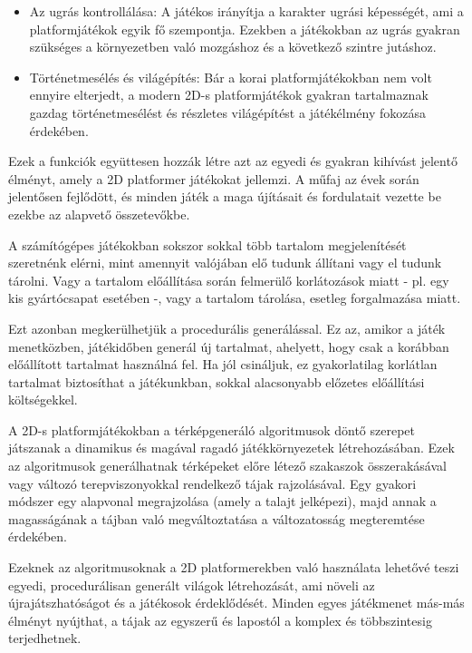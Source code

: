 \begin{itemize}
\item Az ugrás kontrollálása: A játékos irányítja a karakter ugrási képességét, ami a platformjátékok egyik fő szempontja. Ezekben a játékokban az ugrás gyakran szükséges a környezetben való mozgáshoz és a következő szintre jutáshoz.
\item Történetmesélés és világépítés: Bár a korai platformjátékokban nem volt ennyire elterjedt, a modern 2D-s platformjátékok gyakran tartalmaznak gazdag történetmesélést és részletes világépítést a játékélmény fokozása érdekében.
\end{itemize}

Ezek a funkciók együttesen hozzák létre azt az egyedi és gyakran kihívást jelentő élményt, amely a 2D platformer játékokat jellemzi. A műfaj az évek során jelentősen fejlődött, és minden játék a maga újításait és fordulatait vezette be ezekbe az alapvető összetevőkbe.


A számítógépes játékokban sokszor sokkal több tartalom megjelenítését szeretnénk elérni, mint amennyit valójában elő tudunk állítani vagy el tudunk tárolni. Vagy a tartalom előállítása során felmerülő korlátozások miatt - pl. egy kis gyártócsapat esetében -, vagy a tartalom tárolása, esetleg forgalmazása miatt. \cite{platformerconnection}

Ezt azonban megkerülhetjük a procedurális generálással. Ez az, amikor a játék menetközben, játékidőben generál új tartalmat, ahelyett, hogy csak a korábban előállított tartalmat használná fel. Ha jól csináljuk, ez gyakorlatilag korlátlan tartalmat biztosíthat a játékunkban, sokkal alacsonyabb előzetes előállítási költségekkel. \cite{platformerconnection}

A 2D-s platformjátékokban a térképgeneráló algoritmusok döntő szerepet játszanak a dinamikus és magával ragadó játékkörnyezetek létrehozásában. Ezek az algoritmusok generálhatnak térképeket előre létező szakaszok összerakásával vagy változó terepviszonyokkal rendelkező tájak rajzolásával. Egy gyakori módszer egy alapvonal megrajzolása (amely a talajt jelképezi), majd annak a magasságának a tájban való megváltoztatása a változatosság megteremtése érdekében. 

Ezeknek az algoritmusoknak a 2D platformerekben való használata lehetővé teszi egyedi, procedurálisan generált világok létrehozását, ami növeli az újrajátszhatóságot és a játékosok érdeklődését. Minden egyes játékmenet más-más élményt nyújthat, a tájak az egyszerű és lapostól a komplex és többszintesig terjedhetnek. 

